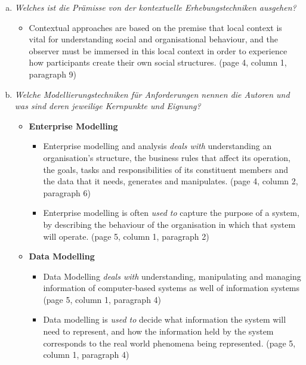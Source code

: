 \begin{enumerate}[a)]
    \item {\itshape Welches ist die Prämisse von der kontextuelle Erhebungstechniken ausgehen?}
    \begin{itemize}
        \item Contextual approaches are based on the premise that local context is vital for understanding social and organisational behaviour, and the observer must be immersed in this local context in order to experience how participants create their own social structures. (page 4, column 1, paragraph 9)
    \end{itemize}
    
    \item {\itshape Welche Modellierungstechniken für Anforderungen nennen die Autoren und was sind deren jeweilige Kernpunkte und Eignung?}
    \begin{itemize}
        \item \textbf{Enterprise Modelling}
        \begin{itemize}
            \item Enterprise modelling and analysis \emph{deals with} understanding an organisation’s structure, the  business rules that affect its operation, the goals, tasks and responsibilities of its constituent members and the data that it needs, generates and manipulates. (page 4, column 2, paragraph 6)
            \item Enterprise modelling is often \emph{used to} capture the purpose of a system, by describing the behaviour of the organisation in which that system will operate. (page 5, column 1, paragraph 2)
        \end{itemize}
        
        \item \textbf{Data Modelling}
        \begin{itemize}
            \item Data Modelling \emph{deals with} understanding, manipulating and managing information of computer-based systems as well of information systems (page 5, column 1, paragraph 4)
            \item Data modelling is \emph{used to} decide what information the system will need to represent, and how the information held by the system corresponds to the real world phenomena being represented. (page 5, column 1, paragraph 4)
            

\end{itemize}
\end{itemize}
\end{enumerate}
